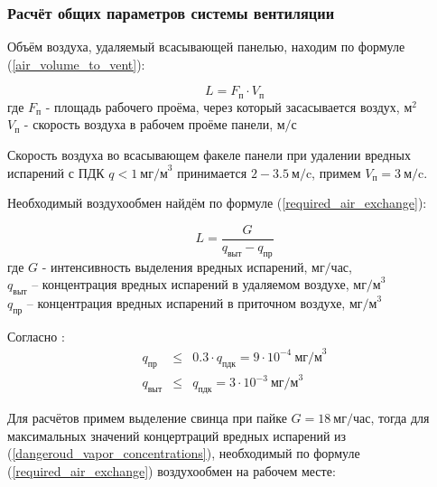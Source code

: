 \subsubsection{Расчёт общих параметров системы вентиляции}

Объём воздуха, удаляемый всасывающей панелью, находим по формуле
(\ref{air_volume_to_vent}):

\begin{equation}
\label{air_volume_to_vent}
    L = F_\text{п} \cdot V_\text{п}
\end{equation}
где $F_\text{п}$ - площадь рабочего проёма, через который засасывается воздух, $\text{м}^2$ \\
$V_\text{п}$ - скорость воздуха в рабочем проёме панели, $\text{м/с}$

Скорость воздуха во всасывающем факеле панели при удалении вредных испарений с
ПДК $q < 1 ~\text{мг/м}^3$ \cite[табл. 1.1]{local_vent_spot_calc_method} принимается
$2 - 3.5 ~\text{м/c}$, примем $V_\text{п} = 3 ~\text{м/c}$.

Необходимый воздухообмен найдём по формуле (\ref{required_air_exchange}):

\begin{equation}
\label{required_air_exchange}
    L = \frac{G}{q_\text{выт} - q_\text{пр}}
\end{equation}
где $G$ - интенсивность выделения вредных испарений, $\text{мг/час}$,                   \\
$q_\text{выт}$ – концентрация вредных испарений в удаляемом воздухе, $\text{мг/м}^3$    \\
$q_\text{пр}$ – концентрация вредных испарений в приточном воздухе, $\text{мг/м}^3$

Согласно \cite[п. 2.15]{ecology_san_norm_245_71}:
\begin{equation}
\label{dangeroud_vapor_concentrations}
    \begin{array}{lcr}
        q_\text{пр}  & \leq & 0.3 \cdot q_\text{пдк} = 9 \cdot 10^{-4} ~\text{мг/м}^3 \\
        q_\text{выт} & \leq &           q_\text{пдк} = 3 \cdot 10^{-3} ~\text{мг/м}^3
    \end{array}
\end{equation}

Для расчётов примем выделение свинца при пайке $G = 18 ~\text{мг/час}$,
тогда для максимальных значений концертраций вредных испарений из
(\ref{dangeroud_vapor_concentrations}), необходимый по формуле (\ref{required_air_exchange})
воздухообмен на рабочем месте:

